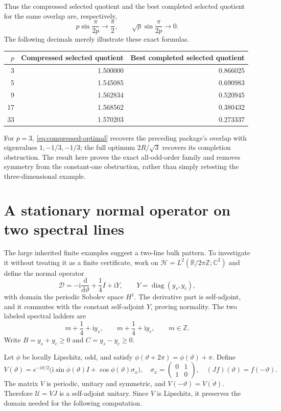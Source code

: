 \documentclass[11pt]{article}
\theoremstyle{remark}
\newcommand{\ii}{\mathrm{i}}
\newcommand{\diag}{\operatorname{diag}}
\begin{document}
Thus the compressed selected quotient and the best completed selected quotient for the same overlap are, respectively,
\begin{equation}\label{eq:contrasting-limits}
 p\sin\frac\pi{2p}\longrightarrow\frac\pi2,
 \qquad
 \sqrt p\sin\frac\pi{2p}\longrightarrow0.
\end{equation}
The following decimals merely illustrate these exact formulas.
\begin{center}
\begin{tabular}{rrr}
\toprule
$p$&Compressed selected quotient&Best completed selected quotient\\\midrule
3&1.500000&0.866025\\
5&1.545085&0.690983\\
9&1.562834&0.520945\\
17&1.568562&0.380432\\
33&1.570203&0.273337\\\bottomrule
\end{tabular}
\end{center}
For $p=3$, \eqref{eq:compressed-optimal} recovers the preceding package's overlap with eigenvalues $1,-1/3,-1/3$; the full optimum $2R/\sqrt3$ recovers its completion obstruction. The result here proves the exact all-odd-order family and removes symmetry from the constant-one obstruction, rather than simply retesting the three-dimensional example.

\section{A stationary normal operator on two spectral lines}
The large inherited finite examples suggest a two-line bulk pattern. To investigate it without treating it as a finite certificate, work on
$\mathcal H=L^2(\mathbb R/2\pi\mathbb Z;\mathbb C^2)$ and define the normal operator
\begin{equation}\label{eq:D-infinite}
 \mathcal D=-\ii\frac{\mathrm d}{\mathrm d\vartheta}+\frac14I+\ii Y,
 \qquad Y=\diag(y_s,y_c),
\end{equation}
with domain the periodic Sobolev space $H^1$. The derivative part is self-adjoint, and it commutes with the constant self-adjoint $Y$, proving normality. The two labeled spectral ladders are
\[
 m+\frac14+\ii y_s,\qquad m+\frac14+\ii y_c,\qquad m\in\mathbb Z.
\]
Write $B=y_s+y_c\ge0$ and $C=y_s-y_c\ge0$.

Let $\phi$ be locally Lipschitz, odd, and satisfy $\phi(\vartheta+2\pi)=\phi(\vartheta)+\pi$. Define
\[
 V(\vartheta)=e^{-\ii\vartheta/2}
 \bigl(\ii\sin\phi(\vartheta)I+\cos\phi(\vartheta)\sigma_x\bigr),
 \quad \sigma_x=\begin{pmatrix}0&1\\1&0\end{pmatrix},
 \quad (Jf)(\vartheta)=f(-\vartheta).
\]
The matrix $V$ is periodic, unitary and symmetric, and $V(-\vartheta)=\overline{V(\vartheta)}$. Therefore $\mathcal U=VJ$ is a self-adjoint unitary. Since $V$ is Lipschitz, it preserves the domain needed for the following computation.
\end{document}
